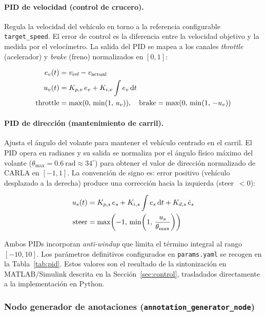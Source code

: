 \documentclass[12pt, a4paper]{article}
\begin{document}
\paragraph{PID de velocidad (control de crucero).}
Regula la velocidad del vehículo en torno a la referencia configurable \texttt{target\_speed}. El error de control es la diferencia entre la velocidad objetivo y la medida por el velocímetro. La salida del PID se mapea a los canales \textit{throttle} (acelerador) y \textit{brake} (freno) normalizados en $[0, 1]$:

\begin{align}
    e_v(t)          & = v_{\text{ref}} - v_{\text{actual}} \notag          \\
    u_v(t)          & = K_{p,v}\,e_v + K_{i,v}\int e_v\,\mathrm{d}t \notag \\
    \text{throttle} & = \max(0,\,\min(1,\, u_v)), \quad
    \text{brake} = \max(0,\,\min(1,\,-u_v)) \notag
\end{align}

\paragraph{PID de dirección (mantenimiento de carril).}
Ajusta el ángulo del volante para mantener el vehículo centrado en el carril. El PID opera en radianes y su salida se normaliza por el ángulo físico máximo del volante ($\theta_{\max} = 0.6~\text{rad} \approx 34^\circ$) para obtener el valor de dirección normalizado de CARLA en $[-1,1]$. La convención de signo es: error positivo (vehículo desplazado a la derecha) produce una corrección hacia la izquierda (steer~$< 0$):

\begin{align}
    u_s(t)       & = K_{p,s}\,e_s + K_{i,s}\int e_s\,\mathrm{d}t + K_{d,s}\,\dot{e}_s \notag         \\
    \text{steer} & = \max\!\left(-1,\,\min\!\left(1,\,\frac{u_s}{\theta_{\max}}\right)\right) \notag
\end{align}

Ambos PIDs incorporan \textit{anti-windup} que limita el término integral al rango $[-10, 10]$. Los parámetros definitivos configurados en \texttt{params.yaml} se recogen en la Tabla~\ref{tab:pid}. Estos valores son el resultado de la sintonización en MATLAB/Simulink descrita en la Sección~\ref{sec:control}, trasladados directamente a la implementación en Python.

\subsubsection{Nodo generador de anotaciones (\texttt{annotation\_generator\_node})}
\end{document}

